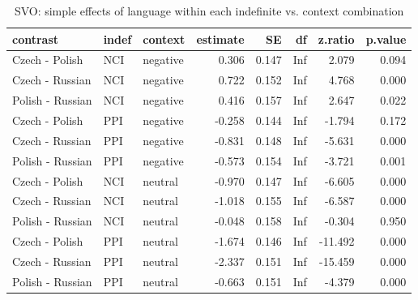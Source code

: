 \begin{table}[!h]
\centering
\caption{SVO: simple effects of language within each indefinite vs. context combination}
\centering
\begin{tabular}[t]{lllrrrrr}
\toprule
contrast & indef & context & estimate & SE & df & z.ratio & p.value\\
\midrule
Czech - Polish & NCI & negative & 0.306 & 0.147 & Inf & 2.079 & 0.094\\
Czech - Russian & NCI & negative & 0.722 & 0.152 & Inf & 4.768 & 0.000\\
Polish - Russian & NCI & negative & 0.416 & 0.157 & Inf & 2.647 & 0.022\\
Czech - Polish & PPI & negative & -0.258 & 0.144 & Inf & -1.794 & 0.172\\
Czech - Russian & PPI & negative & -0.831 & 0.148 & Inf & -5.631 & 0.000\\
\addlinespace
Polish - Russian & PPI & negative & -0.573 & 0.154 & Inf & -3.721 & 0.001\\
Czech - Polish & NCI & neutral & -0.970 & 0.147 & Inf & -6.605 & 0.000\\
Czech - Russian & NCI & neutral & -1.018 & 0.155 & Inf & -6.587 & 0.000\\
Polish - Russian & NCI & neutral & -0.048 & 0.158 & Inf & -0.304 & 0.950\\
Czech - Polish & PPI & neutral & -1.674 & 0.146 & Inf & -11.492 & 0.000\\
\addlinespace
Czech - Russian & PPI & neutral & -2.337 & 0.151 & Inf & -15.459 & 0.000\\
Polish - Russian & PPI & neutral & -0.663 & 0.151 & Inf & -4.379 & 0.000\\
\bottomrule
\end{tabular}
\end{table}
